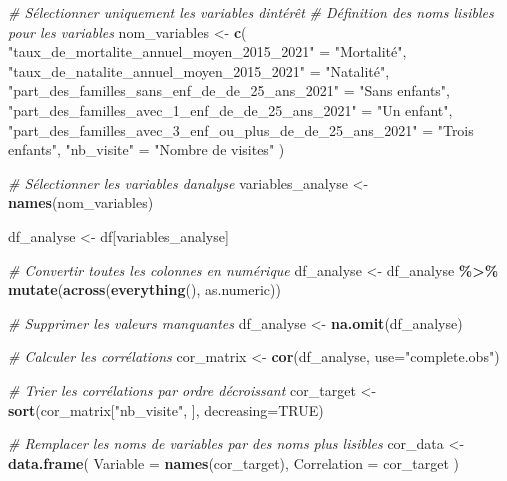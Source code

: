 \documentclass[
]{article}
\newenvironment{Shaded}{\begin{snugshade}}{\end{snugshade}}
\newcommand{\AttributeTok}[1]{\textcolor[rgb]{0.13,0.29,0.53}{#1}}
\newcommand{\CommentTok}[1]{\textcolor[rgb]{0.56,0.35,0.01}{\textit{#1}}}
\newcommand{\ConstantTok}[1]{\textcolor[rgb]{0.56,0.35,0.01}{#1}}
\newcommand{\FunctionTok}[1]{\textcolor[rgb]{0.13,0.29,0.53}{\textbf{#1}}}
\newcommand{\NormalTok}[1]{#1}
\newcommand{\OtherTok}[1]{\textcolor[rgb]{0.56,0.35,0.01}{#1}}
\newcommand{\SpecialCharTok}[1]{\textcolor[rgb]{0.81,0.36,0.00}{\textbf{#1}}}
\newcommand{\StringTok}[1]{\textcolor[rgb]{0.31,0.60,0.02}{#1}}
\begin{document}
\begin{Shaded}
\begin{Highlighting}[]
\CommentTok{\# Sélectionner uniquement les variables d\textquotesingle{}intérêt}
\CommentTok{\# Définition des noms lisibles pour les variables}
\NormalTok{nom\_variables }\OtherTok{\textless{}{-}} \FunctionTok{c}\NormalTok{(}
  \StringTok{"taux\_de\_mortalite\_annuel\_moyen\_2015\_2021"} \OtherTok{=} \StringTok{"Mortalité"}\NormalTok{,}
  \StringTok{"taux\_de\_natalite\_annuel\_moyen\_2015\_2021"} \OtherTok{=} \StringTok{"Natalité"}\NormalTok{,}
  \StringTok{"part\_des\_familles\_sans\_enf\_de\_de\_25\_ans\_2021"} \OtherTok{=} \StringTok{"Sans enfants"}\NormalTok{,}
  \StringTok{"part\_des\_familles\_avec\_1\_enf\_de\_de\_25\_ans\_2021"} \OtherTok{=} \StringTok{"Un enfant"}\NormalTok{,}
  \StringTok{"part\_des\_familles\_avec\_3\_enf\_ou\_plus\_de\_de\_25\_ans\_2021"} \OtherTok{=} \StringTok{"Trois enfants"}\NormalTok{,}
  \StringTok{"nb\_visite"} \OtherTok{=} \StringTok{"Nombre de visites"}
\NormalTok{)}

\CommentTok{\#  Sélectionner les variables d\textquotesingle{}analyse}
\NormalTok{variables\_analyse }\OtherTok{\textless{}{-}} \FunctionTok{names}\NormalTok{(nom\_variables)}

\NormalTok{df\_analyse }\OtherTok{\textless{}{-}}\NormalTok{ df[variables\_analyse]}

\CommentTok{\#  Convertir toutes les colonnes en numérique}
\NormalTok{df\_analyse }\OtherTok{\textless{}{-}}\NormalTok{ df\_analyse }\SpecialCharTok{\%\textgreater{}\%} \FunctionTok{mutate}\NormalTok{(}\FunctionTok{across}\NormalTok{(}\FunctionTok{everything}\NormalTok{(), as.numeric))}

\CommentTok{\# Supprimer les valeurs manquantes}
\NormalTok{df\_analyse }\OtherTok{\textless{}{-}} \FunctionTok{na.omit}\NormalTok{(df\_analyse)  }

\CommentTok{\#  Calculer les corrélations}
\NormalTok{cor\_matrix }\OtherTok{\textless{}{-}} \FunctionTok{cor}\NormalTok{(df\_analyse, }\AttributeTok{use=}\StringTok{"complete.obs"}\NormalTok{)}

\CommentTok{\# Trier les corrélations par ordre décroissant}
\NormalTok{cor\_target }\OtherTok{\textless{}{-}} \FunctionTok{sort}\NormalTok{(cor\_matrix[}\StringTok{"nb\_visite"}\NormalTok{, ], }\AttributeTok{decreasing=}\ConstantTok{TRUE}\NormalTok{)}

\CommentTok{\#  Remplacer les noms de variables par des noms plus lisibles}
\NormalTok{cor\_data }\OtherTok{\textless{}{-}} \FunctionTok{data.frame}\NormalTok{(}
  \AttributeTok{Variable =} \FunctionTok{names}\NormalTok{(cor\_target),}
  \AttributeTok{Correlation =}\NormalTok{ cor\_target}
\NormalTok{)}


\end{Highlighting}
\end{Shaded}
\end{document}
